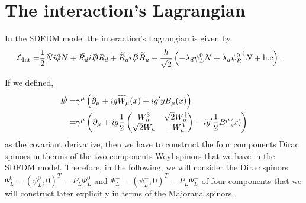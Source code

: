 
\section{The interaction's Lagrangian}
\label{sec:lag-interaction}

In the SDFDM model the interaction's Lagrangian is given by
%
\begin{align}
\label{eq:lint1}
\mathcal{L}_{\text{Int}}
= & \dfrac{1}{2}\bar{N}i\slashed{\partial}N + \bar{R_d}i\slashed{D}R_d + \bar{\widetilde{R}_u}i\slashed{D}\widetilde{R}_u
- \dfrac{h}{\sqrt{2}}\left(-\lambda_d\psi_L^0N + \lambda_u{\psi_R^0}^{\dagger}N+\text{h.c}\right)\,.
\end{align}

If we defined, 
\begin{align}
\label{eq:devcov}
\slashed{D}=&\gamma^{\mu}\left(\partial_{\mu}+ig\widetilde{W}_{\mu}(x)+ig'yB_{\mu}(x)\right)\nonumber\\
=&\gamma^{\mu}\left(\partial_{\mu}
+ig\dfrac{1}{2}\begin{pmatrix}
W_{\mu}^3 & \sqrt{2}W_{\mu}^{\dagger} \\
\sqrt{2}W_{\mu} & -W_{\mu}^3
\end{pmatrix}
-ig'\dfrac{1}{2} B^{\mu}(x)\right)
\end{align}
%
as the covariant derivative, then we have to construct the four components Dirac spinors in therms of the two components Weyl spinors that we have in the SDFDM model. 
Therefore, in the following,  we will consider the Dirac spinors $\Psi_{L}^0=(\psi_L^0,0)^{T}=P_{L}\Psi_L^0$ and $\Psi_{L}^-=(\psi_L^-,0)^{T}=P_{L}\Psi_L^-$  of four components that we will construct later explicitly in terms of the Majorana spinors. 

